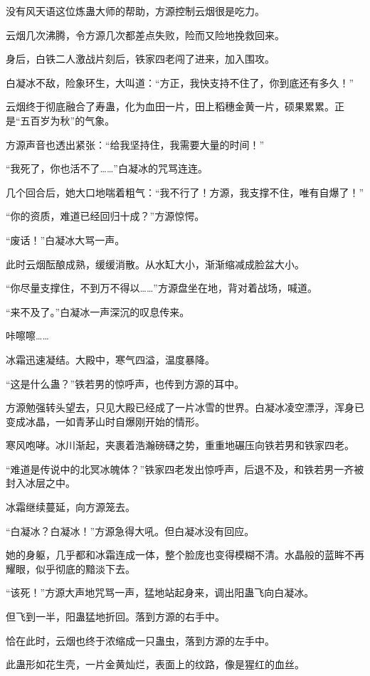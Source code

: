 \begin{this_body}
没有风天语这位炼蛊大师的帮助，方源控制云烟很是吃力。

云烟几次沸腾，令方源几次都差点失败，险而又险地挽救回来。

身后，白铁二人激战片刻后，铁家四老闯了进来，加入围攻。

白凝冰不敌，险象环生，大叫道：“方正，我快支持不住了，你到底还有多久！”

云烟终于彻底融合了寿蛊，化为血田一片，田上稻穗金黄一片，硕果累累。正是“五百岁为秋”的气象。

方源声音也透出紧张：“给我坚持住，我需要大量的时间！”

“我死了，你也活不了……”白凝冰的咒骂连连。

几个回合后，她大口地喘着粗气：“我不行了！方源，我支撑不住，唯有自爆了！”

“你的资质，难道已经回归十成？”方源惊愕。

“废话！”白凝冰大骂一声。

此时云烟酝酿成熟，缓缓消散。从水缸大小，渐渐缩减成脸盆大小。

“你尽量支撑住，不到万不得以……”方源盘坐在地，背对着战场，喊道。

“来不及了。”白凝冰一声深沉的叹息传来。

咔嚓嚓……

冰霜迅速凝结。大殿中，寒气四溢，温度暴降。

“这是什么蛊？”铁若男的惊呼声，也传到方源的耳中。

方源勉强转头望去，只见大殿已经成了一片冰雪的世界。白凝冰凌空漂浮，浑身已变成冰晶，一如青茅山时自爆刚开始的情形。

寒风咆哮。冰川渐起，夹裹着浩瀚磅礴之势，重重地碾压向铁若男和铁家四老。

“难道是传说中的北冥冰魄体？”铁家四老发出惊呼声，后退不及，和铁若男一齐被封入冰层之中。

冰霜继续蔓延，向方源笼去。

“白凝冰？白凝冰！”方源急得大吼。但白凝冰没有回应。

她的身躯，几乎都和冰霜连成一体，整个脸庞也变得模糊不清。水晶般的蓝眸不再耀眼，似乎彻底的黯淡下去。

“该死！”方源大声地咒骂一声，猛地站起身来，调出阳蛊飞向白凝冰。

但飞到一半，阳蛊猛地折回。落到方源的右手中。

恰在此时，云烟也终于浓缩成一只蛊虫，落到方源的左手中。

此蛊形如花生壳，一片金黄灿烂，表面上的纹路，像是猩红的血丝。


\end{this_body}
